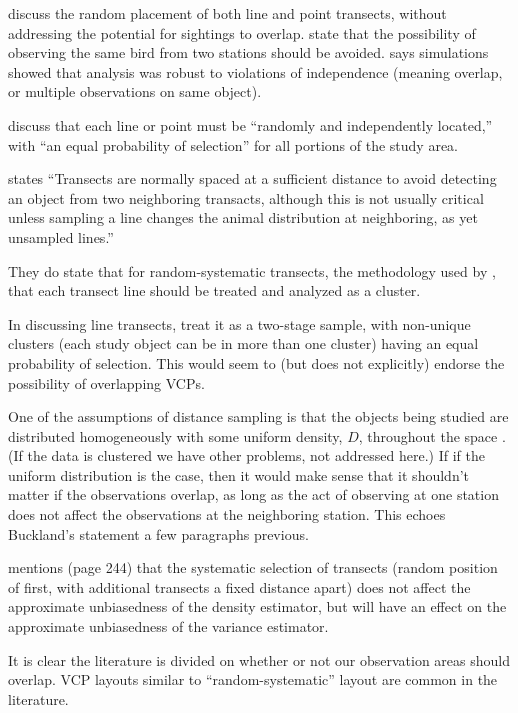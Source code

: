\documentclass[12pt]{article}
\begin{document}
\textcite{buckland2001} discuss the random placement of both line and point transects, without addressing the potential for sightings to overlap. \textcite{reynolds1980} state that the possibility of observing the same bird from two stations should be avoided. \textcite{buckland2006} says simulations showed that analysis was robust to violations of independence (meaning overlap, or multiple observations on same object).

\textcite[233]{buckland2001} discuss that each line or point must be ``randomly and independently located,'' with ``an equal probability of selection'' for all portions of the study area.

\textcite[235]{buckland2001} states ``Transects are normally spaced at a sufficient distance to avoid detecting an object from two neighboring transacts, although this is not usually critical unless sampling a line changes the animal distribution at neighboring, as yet unsampled lines.''

They do state that for random-systematic transects, the methodology used by \textcite{micronesian}, that each transect line should be treated and analyzed as a cluster.

In discussing line transects, \textcite{barry2001} treat it as a two-stage sample, with non-unique clusters (each study object can be in more than one cluster) having an equal probability of selection. This would seem to (but does not explicitly) endorse the possibility of overlapping VCPs. 

One of the assumptions of distance sampling is that the objects being studied are distributed homogeneously with some uniform density, $D$, throughout the space \textcite{ramsey1981}.  (If the data is clustered we have other problems, not addressed here.) If if the uniform distribution is the case, then it would make sense that it shouldn't matter if the observations overlap, as long as the act of observing at one station does not affect the observations at the neighboring station. This echoes Buckland’s statement a few paragraphs previous.

\textcite[244]{thompson2012} mentions (page 244) that the systematic selection of transects (random position of first, with additional transects a fixed distance apart) does not affect the approximate unbiasedness of the density estimator, but will have an effect on the approximate unbiasedness of the variance estimator. 

It is clear the literature is divided on whether or not our observation areas should overlap. VCP layouts similar to \textcite{micronesian} ``random-systematic'' layout are common in the literature.
\end{document}
